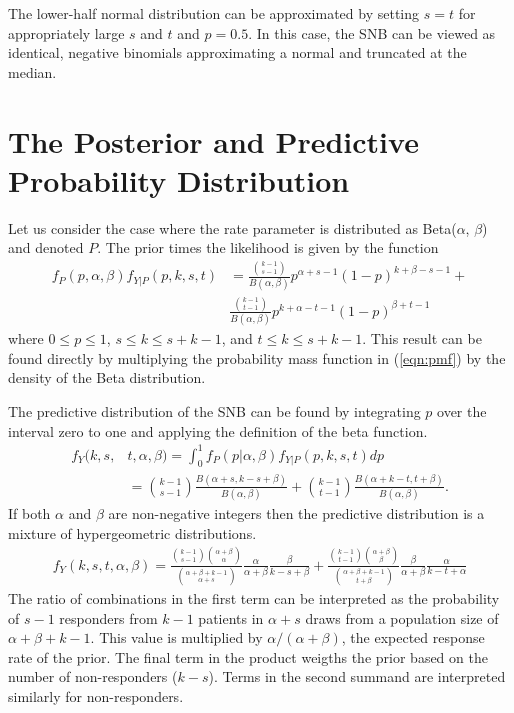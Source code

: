 \documentclass[review]{elsarticle}
\begin{document}
The lower-half normal distribution can be approximated by setting $s=t$
for appropriately large $s$ and $t$ and $p = 0.5$. In this
case, the SNB can be viewed as identical, negative binomials
approximating a normal and truncated at the median.

\section{The Posterior and Predictive Probability Distribution}

Let us consider the case where the rate parameter is distributed 
as Beta($\alpha$, $\beta$) and denoted $P$.
The prior times the likelihood is given by the function
\begin{align} \label{eqn:ptl}
f_P(p, \alpha, \beta ) f_{Y|P}(p, k, s, t) &= 
  \frac{ {k-1 \choose s-1} }{B(\alpha, \beta)} p^{\alpha +s -1} 
    (1-p)^{k+\beta-s-1} + \\
  & \frac{ {k-1 \choose t-1} }{B(\alpha, \beta)} p^{k+\alpha -t -1} 
    (1-p)^{\beta+t-1} \nonumber
\end{align}
where $0 \leq p \leq 1$, $s \leq k \leq s+k-1$, and $t \leq k \leq s+k-1$.
This result can be found directly by multiplying the probability mass function
in (\ref{eqn:pmf}) by the density of the Beta distribution.

The predictive distribution of the SNB can be found by integrating
$p$ over the interval zero to one and applying the definition of the 
beta function.
\begin{align} \label{eqn:predictive}
f_{Y}(k, s, &t, \alpha, \beta) = 
  \int_0^1 f_P(p | \alpha, \beta )  f_{Y|P}(p, k, s, t) dp \nonumber \\ 
 & = {k-1 \choose s-1} \frac{B\left(\alpha+s, k-s+\beta \right)}{B(\alpha, \beta)} 
    + {k-1 \choose t-1} 
    \frac{B\left(\alpha + k - t, t+\beta\right)}{B(\alpha, \beta)}.
\end{align}
If both $\alpha$ and $\beta$ are non-negative integers then the predictive
distribution is a mixture of hypergeometric distributions. 
\begin{align*} \label{eqn:hypergeo}
f_{Y}(k, s, t, \alpha, \beta) = 
  \frac{ {k - 1 \choose s - 1 } 
         {\alpha + \beta \choose \alpha} }{
         {\alpha + \beta + k - 1 \choose \alpha + s}}
  \frac{\alpha}{\alpha + \beta}
  \frac{ \beta }{ k-s+\beta } +
  \frac{ {k - 1 \choose t - 1} 
         {\alpha + \beta \choose \beta} 
         }{
         {\alpha + \beta + k -1 \choose t + \beta}
       }
  \frac{ \beta }{ \alpha + \beta}
  \frac{ \alpha }{ k-t + \alpha}
\end{align*}
The ratio of combinations in the first term can be interpreted as the
probability of $s-1$ responders from $k-1$ patients in $\alpha + s$ draws
from a population size of $\alpha + \beta + k - 1$. This value is multiplied
by $\alpha / (\alpha + \beta)$, the expected response rate of the prior. 
The final term in the product weigths the prior based on the number
of non-responders ($k-s$). Terms in the second summand are interpreted similarly
for non-responders.
\end{document}
